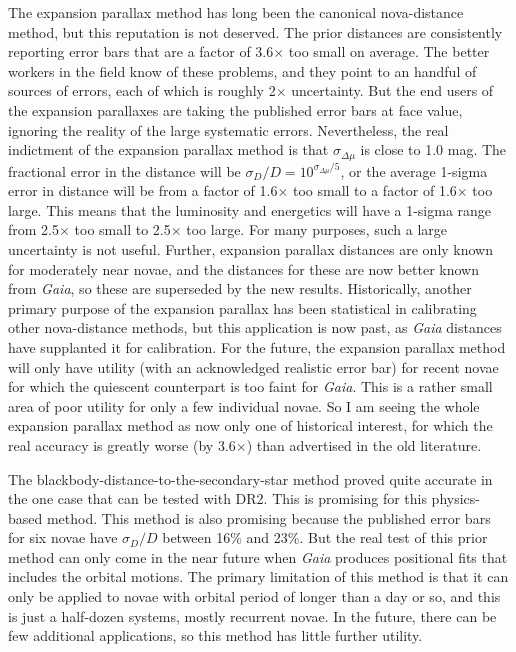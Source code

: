 \documentclass[a4paper,fleqn,usenatbib]{mnras}
\begin{document}
The expansion parallax method has long been the canonical nova-distance method, but this reputation is not deserved.  The prior distances are consistently reporting error bars that are a factor of 3.6$\times$ too small on average.  The better workers in the field know of these problems, and they point to an handful of sources of errors, each of which is roughly 2$\times$ uncertainty.  But the end users of the expansion parallaxes are taking the published error bars at face value, ignoring the reality of the large systematic errors.  Nevertheless, the real indictment of the expansion parallax method is that $\sigma_{\Delta \mu}$ is close to 1.0 mag.  The fractional error in the distance will be $\sigma_D/D=10^{\sigma_{\Delta \mu}/5}$, or the average 1-sigma error in distance will be from a factor of 1.6$\times$ too small to a factor of 1.6$\times$ too large.  This means that the luminosity and energetics will have a 1-sigma range from 2.5$\times$ too small to 2.5$\times$ too large.  For many purposes, such a large uncertainty is not useful.  Further, expansion parallax distances are only known for moderately near novae, and the distances for these are now better known from {\it Gaia}, so these are superseded by the new results.  Historically, another primary purpose of the expansion parallax has been statistical in calibrating other nova-distance methods, but this application is now past, as {\it Gaia} distances have supplanted it for calibration.  For the future, the expansion parallax method will only have utility (with an acknowledged realistic error bar) for recent novae for which the quiescent counterpart is too faint for {\it Gaia}.  This is a rather small area of poor utility for only a few individual novae.  So I am seeing the whole expansion parallax method as now only one of historical interest, for which the real accuracy is greatly worse (by 3.6$\times$) than advertised in the old literature.

The blackbody-distance-to-the-secondary-star method proved quite accurate in the one case that can be tested with DR2.  This is promising for this physics-based method.  This method is also promising because the published error bars for six novae have $\sigma_D/D$ between 16\% and 23\%.  But the real test of this prior method can only come in the near future when {\it Gaia} produces positional fits that includes the orbital motions.  The primary limitation of this method is that it can only be applied to novae with orbital period of longer than a day or so, and this is just a half-dozen systems, mostly recurrent novae.  In the future, there can be few additional applications, so this method has little further utility.
\end{document}
